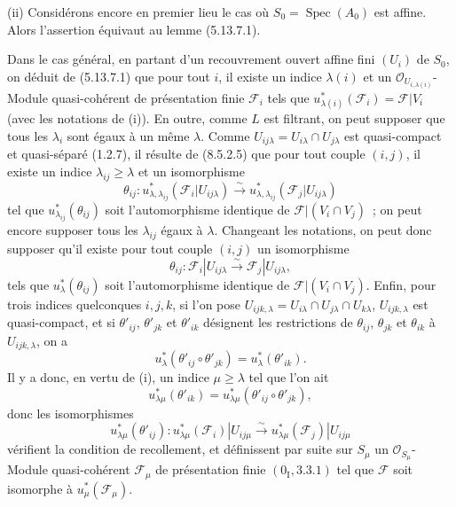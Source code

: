 \par\medskip\noindent\textup{(ii)} Considérons encore en premier lieu le cas où
$S_0=\operatorname{Spec}(A_0)$ est
affine. Alors l'assertion équivaut au lemme (5.13.7.1).

Dans le cas général, en partant d'un recouvrement ouvert affine fini $(U_i)$
de $S_0$, on déduit de (5.13.7.1) que pour tout $i$, il existe un indice
$\lambda(i)$ et un $\mathcal O_{U_{i,\lambda(i)}}$-Module quasi-cohérent de
présentation finie $\mathcal F_i$ tels que
$u_{\lambda(i)}^*(\mathcal F_i)=\mathcal F|V_i$ (avec les notations de (i)). En
outre, comme $L$ est filtrant, on peut supposer que tous les $\lambda_i$ sont
égaux à un même $\lambda$. Comme
$U_{ij\lambda}=U_{i\lambda}\cap U_{j\lambda}$ est quasi-compact et
quasi-séparé (1.2.7), il résulte de (8.5.2.5) que pour tout couple $(i,j)$, il
existe un indice $\lambda_{ij}\geq\lambda$ et un isomorphisme
\[
  \theta_{ij}:u_{\lambda,\lambda_{ij}}^*(\mathcal F_i|U_{ij\lambda})
  \xrightarrow{\sim}
  u_{\lambda,\lambda_{ij}}^*(\mathcal F_j|U_{ij\lambda})
\]
tel que $u_{\lambda_{ij}}^*(\theta_{ij})$ soit l'automorphisme identique de
$\mathcal F|(V_i\cap V_j)$~; on peut encore supposer tous les
$\lambda_{ij}$ égaux à $\lambda$. Changeant les notations, on peut donc
supposer qu'il existe pour tout couple $(i,j)$ un isomorphisme
\[
  \theta_{ij}:\mathcal F_i|U_{ij\lambda}
  \xrightarrow{\sim}\mathcal F_j|U_{ij\lambda},
\]
tels que $u_\lambda^*(\theta_{ij})$ soit l'automorphisme identique de
$\mathcal F|(V_i\cap V_j)$. Enfin, pour trois indices quelconques $i,j,k$, si
l'on pose
$U_{ijk,\lambda}=U_{i\lambda}\cap U_{j\lambda}\cap U_{k\lambda}$,
$U_{ijk,\lambda}$ est quasi-compact, et si $\theta'_{ij}$, $\theta'_{jk}$ et
$\theta'_{ik}$ désignent les restrictions de $\theta_{ij}$, $\theta_{jk}$ et
$\theta_{ik}$ à $U_{ijk,\lambda}$, on a
\[
  u_\lambda^*(\theta'_{ij}\circ\theta'_{jk})=u_\lambda^*(\theta'_{ik}).
\]
Il y a donc, en vertu de (i), un indice $\mu\geq\lambda$ tel que l'on ait
\[
  u_{\lambda\mu}^*(\theta'_{ik})
  =u_{\lambda\mu}^*(\theta'_{ij}\circ\theta'_{jk}),
\]
donc les isomorphismes
\[
  u_{\lambda\mu}^*(\theta'_{ij}):
  u_{\lambda\mu}^*(\mathcal F_i)|U_{ij\mu}
  \xrightarrow{\sim}
  u_{\lambda\mu}^*(\mathcal F_j)|U_{ij\mu}
\]
vérifient la condition de recollement, et définissent par suite sur $S_\mu$ un
$\mathcal O_{S_\mu}$-Module quasi-cohérent $\mathcal F_\mu$ de présentation
finie $(0_{\mathrm I},3.3.1)$ tel que $\mathcal F$ soit isomorphe à
$u_\mu^*(\mathcal F_\mu)$.

